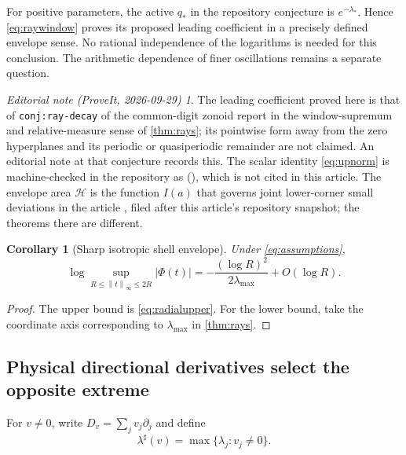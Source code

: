 \documentclass[11pt,a4paper]{article}
\numberwithin{equation}{section}
\newtheorem{corollary}[theorem]{Corollary}
\theoremstyle{definition}
\theoremstyle{remark}\newtheorem{remark}[theorem]{Remark}
\newtheorem*{ednote}{Editorial note (ProveIt, 2026-09-29)}
\newcommand{\He}{\mathcal H}
\newcommand{\norm}[1]{\left\lVert #1\right\rVert}
\begin{document}
For positive parameters, the active $q_*$ in the repository conjecture is
$e^{-\lambda_*}$. Hence \eqref{eq:raywindow} proves its proposed leading
coefficient in a precisely defined envelope sense. No rational independence
of the logarithms is needed for this conclusion. The arithmetic dependence
of finer oscillations remains a separate question.

\begin{ednote}
The leading coefficient proved here is that of \texttt{conj:ray-decay} of
the common-digit zonoid report
 in the
window-supremum and relative-measure sense of \cref{thm:rays}; its pointwise
form away from the zero hyperplanes and its periodic or quasiperiodic
remainder are not claimed. An editorial note at that conjecture records
this. The scalar identity \eqref{eq:upnorm} is machine-checked in the
repository as 
(),
which is not cited in this article. The envelope area $\He$ is the function
$I(a)$ that governs joint lower-corner small deviations in the article
, filed
after this article's repository snapshot; the theorems there are different.
\end{ednote}

\begin{corollary}[Sharp isotropic shell envelope]
\label{cor:shell}
Under \eqref{eq:assumptions},
\begin{equation}
 \log\sup_{R\le\norm t_\infty\le2R}|\Phi(t)|
      =-\frac{(\log R)^2}{2\lambda_{\max}}+O(\log R).
 \label{eq:shell}
\end{equation}
\end{corollary}
\begin{proof}
The upper bound is \eqref{eq:radialupper}. For the lower bound, take the
coordinate axis corresponding to $\lambda_{\max}$ in \cref{thm:rays}.
\end{proof}

\subsection{Physical directional derivatives select the opposite extreme}

For $v\ne0$, write $D_v=\sum_jv_j\partial_j$ and define
\begin{equation}
 \lambda^\sharp(v)=\max\{\lambda_j:v_j\ne0\}.
 \label{eq:lambdasharp}
\end{equation}
\end{document}
